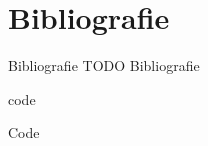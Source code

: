 \documentclass[presentatie.tex]{subfiles}
\begin{document}
\section{Bibliografie}

\clearrecentlist
    
\begin{frame}{Bibliografie}
    TODO Bibliografie
\end{frame}

\begin{saveblock}{code}
	\begin{highlightblock}[gobble=8,linewidth=0.5\textwidth,framexleftmargin=0.25em]
        Code         
	\end{highlightblock}
\end{saveblock}
\end{document}
